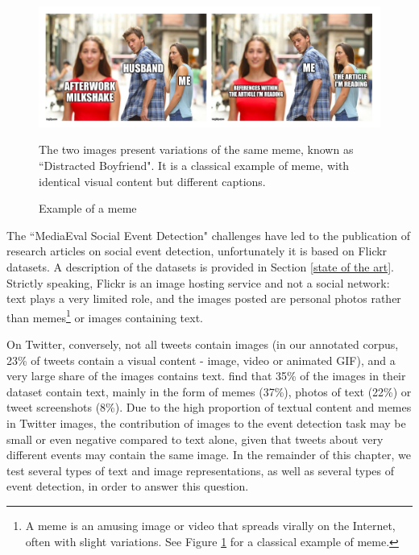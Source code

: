 \begin{figure}
\begin{center}
\includegraphics[width=1\textwidth]{figures/distracted_boyfriend.png}
\end{center}
{\scriptsize The two images present variations of the same meme, known as ``Distracted Boyfriend". It is a classical example of meme, with identical visual content but different captions.
}
\caption{Example of a meme}
\label{Figure:meme}
\end{figure}

The ``MediaEval Social Event Detection" challenges \citep{reuter2013social, petkos2014social} have led to the publication of research articles on social event detection, unfortunately it is based on Flickr datasets. A description of the datasets is provided in Section \ref{state of the art}. Strictly speaking, Flickr is an image hosting service and not a social network: text plays a very limited role, and the images posted are personal photos rather than memes\footnote{A meme is an amusing image or video that spreads virally on the Internet, often with slight variations. See Figure \ref{Figure:meme} for a classical example of meme.} or images containing text.  

On Twitter, conversely, not all tweets contain images (in our annotated corpus, 23\% of tweets contain a visual
content - image, video or animated GIF), and a very large share of the images contains text. \citet{chen2016context} find that 35\% of the images in their dataset contain text, mainly in the form of memes (37\%), photos of text (22\%) or tweet screenshots (8\%). Due to the high proportion of textual content and memes in Twitter images, the contribution of images to the event detection task may be small or even negative compared to text alone, given that tweets about very different events may contain the same image. In the remainder of this chapter, we test several types of text and image representations, as well as several types of event detection, in order to answer this question.

